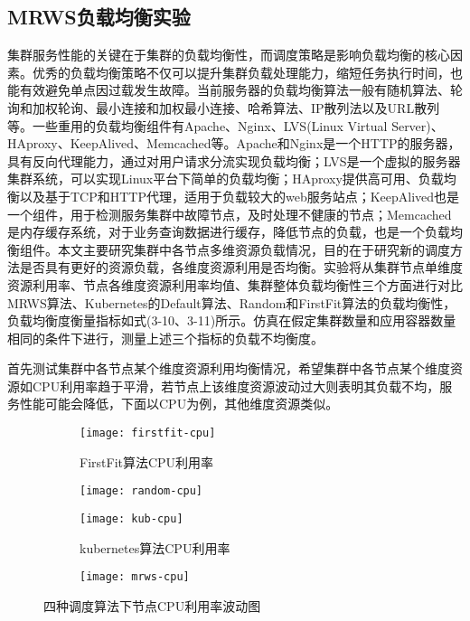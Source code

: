\subsection{MRWS负载均衡实验}
集群服务性能的关键在于集群的负载均衡性，而调度策略是影响负载均衡的核心因素。优秀的负载均衡策略不仅可以提升集群负载处理能力，缩短任务执行时间，也能有效避免单点因过载发生故障。当前服务器的负载均衡算法一般有随机算法、轮询和加权轮询、最小连接和加权最小连接、哈希算法、IP散列法以及URL散列等。一些重用的负载均衡组件有Apache、Nginx、LVS(Linux Virtual Server)、HAproxy、KeepAlived、Memcached等。Apache和Nginx是一个HTTP的服务器，具有反向代理能力，通过对用户请求分流实现负载均衡；LVS是一个虚拟的服务器集群系统，可以实现Linux平台下简单的负载均衡；HAproxy提供高可用、负载均衡以及基于TCP和HTTP代理，适用于负载较大的web服务站点；KeepAlived也是一个组件，用于检测服务集群中故障节点，及时处理不健康的节点；Memcached是内存缓存系统，对于业务查询数据进行缓存，降低节点的负载，也是一个负载均衡组件。本文主要研究集群中各节点多维资源负载情况，目的在于研究新的调度方法是否具有更好的资源负载，各维度资源利用是否均衡。实验将从集群节点单维度资源利用率、节点各维度资源利用率均值、集群整体负载均衡性三个方面进行对比MRWS算法、Kubernetes的Default算法、Random和FirstFit算法的负载均衡性，负载均衡度衡量指标如式(3-10、3-11)所示。仿真在假定集群数量和应用容器数量相同的条件下进行，测量上述三个指标的负载不均衡度。

首先测试集群中各节点某个维度资源利用均衡情况，希望集群中各节点某个维度资源如CPU利用率趋于平滑，若节点上该维度资源波动过大则表明其负载不均，服务性能可能会降低，下面以CPU为例，其他维度资源类似。
\begin{figure}[h]
	\centering%
	\begin{subfigure}{7cm}
		\texttt{[image: firstfit-cpu]}
		\caption{FirstFit算法CPU利用率}
	\end{subfigure}%
	\hspace{0.5cm}%
	\begin{subfigure}{7cm}
		\texttt{[image: random-cpu]}
	\end{subfigure}
	\begin{subfigure}{7cm}
		\texttt{[image: kub-cpu]}
		\caption{kubernetes算法CPU利用率}
	\end{subfigure}%
	\hspace{0.5cm}%
	\begin{subfigure}{7cm}
		\texttt{[image: mrws-cpu]}
	\end{subfigure}
	\caption{四种调度算法下节点CPU利用率波动图}
	
\end{figure}

